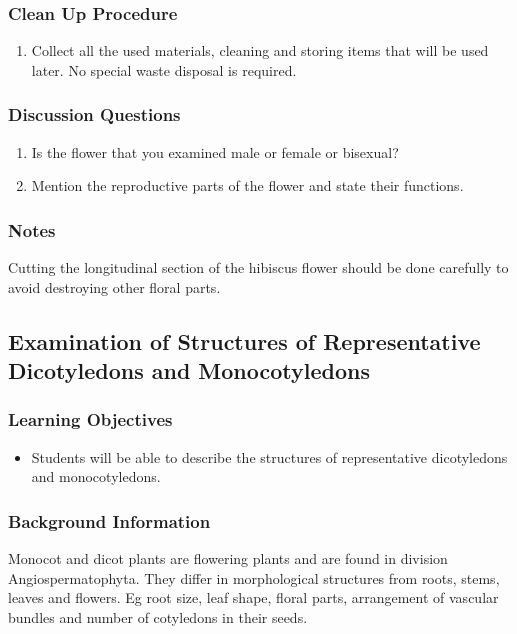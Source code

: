 \subsubsection*{Clean Up Procedure}
\begin{enumerate}
\item{Collect all the used materials, cleaning and storing items that will be used later. No special waste disposal is required.}
\end{enumerate}

\subsubsection*{Discussion Questions}
\begin{enumerate}
\item{Is the flower that you examined male or female or bisexual?}
\item{Mention the reproductive parts of the flower and state their functions.}
\end{enumerate}

\subsubsection*{Notes}
Cutting the longitudinal section of the hibiscus flower should be done carefully to avoid destroying other floral parts.
 
 
\subsection{Examination of Structures of Representative Dicotyledons and Monocotyledons}

\subsubsection*{Learning Objectives}
\begin{itemize}
\item{Students will be able to describe the structures of representative dicotyledons and monocotyledons.}
\end{itemize}

\subsubsection*{Background Information}
Monocot and dicot plants are flowering plants and are found in division Angiospermatophyta. They differ in morphological structures from roots, stems, leaves and flowers. Eg root size, leaf shape, floral parts, arrangement of vascular bundles and number of cotyledons in their seeds.

